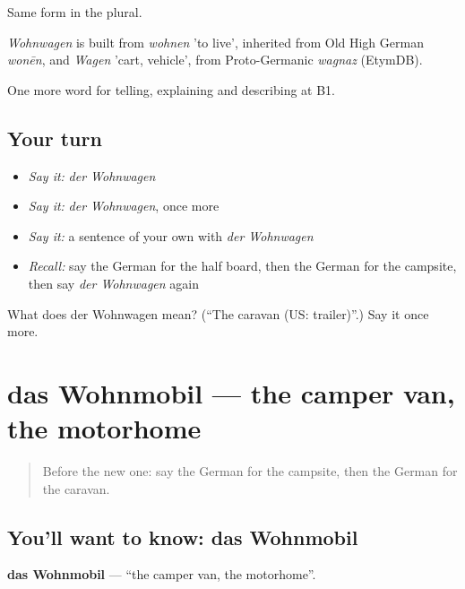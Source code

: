 Same form in the plural.

\begin{cousinweb}
\emph{Wohnwagen} is built from \emph{wohnen} 'to live', inherited from Old High German \emph{wonēn}, and \emph{Wagen} 'cart, vehicle', from Proto-Germanic \emph{wagnaz} (EtymDB).
\end{cousinweb}

\begin{grammarlens}[title={What you've built}]
One more word for telling, explaining and describing at B1.
\end{grammarlens}

\subsection*{Your turn}
\begin{itemize}
\raggedright
  \item \emph{Say it:} \emph{der Wohnwagen}
  \item \emph{Say it:} \emph{der Wohnwagen}, once more
  \item \emph{Say it:} a sentence of your own with \emph{der Wohnwagen}
  \item \emph{Recall:} say the German for the half board, then the German for the campsite, then say \emph{der Wohnwagen} again
\end{itemize}

\begin{tcolorbox}[breakable,colback=teal!4,colframe=teal!35!black,title={Before you move on}]
What does der Wohnwagen mean? (\textquotedblleft{}The caravan (US: trailer)\textquotedblright{}.) Say it once more.
\end{tcolorbox}
\section[das Wohnmobil]{das Wohnmobil — the camper van, the motorhome}

\label{lesson:GE-C425-wohnmobil}



\begin{quote}
Before the new one: say the German for the campsite, then the German for the caravan.
\end{quote}

\subsection*{You'll want to know: das Wohnmobil}
\textbf{das Wohnmobil} — \textquotedblleft{}the camper van, the motorhome\textquotedblright{}.

